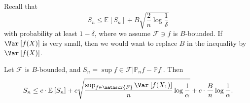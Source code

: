 Recall that \[
	S_n \leq \mathbb{E}_{}\left[S_n \right] + B \sqrt{\frac{2}{n}\log \frac{1}{\delta }}
\]
with probability at least \(1 - \delta \), where we assume \(\mathscr{F} \ni f\) is \(B\)-bounded. If \(\Var_{}\left[f(X) \right] \) is very small, then we would want to replace \(B\) in the inequality by \(\Var_{}\left[f(X) \right] \).

\begin{theorem}
	Let \(\mathscr{F} \) is \(B\)-bounded, and \(S_n = \sup f\in \mathscr{F} \vert \mathbb{P} _n f - \mathbb{P} f \vert \). Then
	\[
		S_n \leq c\cdot \mathbb{E}_{}\left[S_n \right] + c \sqrt{\frac{\sup_{f\in \mathscr{F}} \Var_{}\left[f(X_1) \right] }{n} \log \frac{1}{\alpha }} + c\cdot \frac{B}{n} \log \frac{1}{\alpha }.
	\]
\end{theorem}